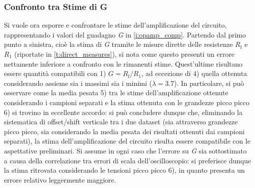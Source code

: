 \documentclass[a4paper,11pt]{article} %
\begin{document}

\subsubsection{Confronto tra Stime di G}
%
%
%


Si vuole ora esporre e confrontare le stime dell'amplificazione del circuito, rappresentando i valori del guadagno
\textit{G} in \autoref{i:opamp_comp}. Partendo dal primo punto a sinistra, cioè la stima di \textit{G} tramite le misure
dirette delle resistenze $R_{\text{f}}$ e $R_{1}$ (riportate in \autoref{t:direct_measures}), si nota come questo
presenti un errore nettamente inferiore a confronto con le rimanenti stime. Quest'ultime risultano essere quantità
compatibili con 1) $G=R_{\text{f}}/R_{1}$, ad eccezione di 4) quella ottenuta considerando assieme sia i massimi sia i
minimi ($\lambda = 3.7$). In particolare, si può osservare come la media pesata 5) tra le stime dell'amplificazione
ottenute considerando i campioni separati e la stima ottenuta con le grandezze picco picco 6) si trovino in eccellente
accordo: si può concludere dunque che, eliminando la sistematica di offset/shift verticale tra i due dataset (sia
attraverso grandezze picco picco, sia considerando la media pesata dei risultati ottenuti dai campioni separati), la
stima dell'amplificazione del circuito risulta essere compatibile con le aspettative preliminari. Si assume in ogni caso
che l'errore su \textit{G} sia sottostimato a causa della correlazione tra errori di scala dell'oscilloscopio: si
preferisce dunque la stima ritrovata considerando le tensioni picco picco 6), in quanto presenta un errore relativo
leggermente maggiore.
\end{document}
